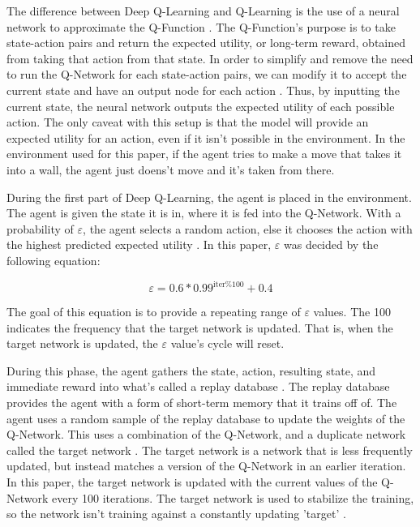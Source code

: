 \documentclass[12pt,letterpaper]{article}
\begin{document}
The difference between Deep Q-Learning and Q-Learning is the use of a neural network to approximate the Q-Function \cite{article_human_level_control_deep_reinforcement_learning}.
The Q-Function's purpose is to take state-action pairs and return the expected utility, or long-term reward, obtained from taking that action from that state.
In order to simplify and remove the need to run the Q-Network for each state-action pairs, we can modify it to accept the current state and have an output node for each action \cite{article_reinforcement_learning_survey}.
Thus, by inputting the current state, the neural network outputs the expected utility of each possible action.
The only caveat with this setup is that the model will provide an expected utility for an action, even if it isn't possible in the environment.
In the environment used for this paper, if the agent tries to make a move that takes it into a wall, the agent just doens't move and it's taken from there.

During the first part of Deep Q-Learning, the agent is placed in the environment.
The agent is given the state it is in, where it is fed into the Q-Network.
With a probability of $\varepsilon$, the agent selects a random action, else it chooses the action with the highest predicted expected utility \cite{article_reinforcement_learning_survey}.
In this paper, $\varepsilon$ was decided by the following equation:

$$\varepsilon = 0.6 * 0.99^{\text{iter} \% 100} + 0.4$$

The goal of this equation is to provide a repeating range of $\varepsilon$ values.
The 100 indicates the frequency that the target network is updated.
That is, when the target network is updated, the $\varepsilon$ value's cycle will reset.

During this phase, the agent gathers the state, action, resulting state, and immediate reward into what's called a replay database \cite{article_reinforcement_learning_for_robots}.
The replay database provides the agent with a form of short-term memory that it trains off of.
The agent uses a random sample of the replay database to update the weights of the Q-Network.
This uses a combination of the Q-Network, and a duplicate network called the target network \cite{article_human_level_control_deep_reinforcement_learning}.
The target network is a network that is less frequently updated, but instead matches a version of the Q-Network in an earlier iteration.
In this paper, the target network is updated with the current values of the Q-Network every 100 iterations.
The target network is used to stabilize the training, so the network isn't training against a constantly updating 'target' \cite{article_human_level_control_deep_reinforcement_learning}.
\end{document}
